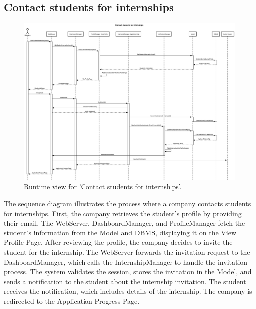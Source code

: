 \subsection{Contact students for internships}
\begin{figure}[H]
    \begin{center}
        \includegraphics[width=0.8\linewidth]{DD/LaTeX/Images/RuntimeView/ContactStudent.png}
        \caption{Runtime view for 'Contact students for internships'.}
        \label{fig:runtime_ContactStudent}%
    \end{center}
\end{figure}

The sequence diagram illustrates the process where a company contacts students for internships. First, the company retrieves the student's profile by providing their email. The WebServer, DashboardManager, and ProfileManager fetch the student's information from the Model and DBMS, displaying it on the View Profile Page. After reviewing the profile, the company decides to invite the student for the internship. The WebServer forwards the invitation request to the DashboardManager, which calls the InternshipManager to handle the invitation process. The system validates the session, stores the invitation in the Model, and sends a notification to the student about the internship invitation. The student receives the notification, which includes details of the internship. The company is redirected to the Application Progress Page.

